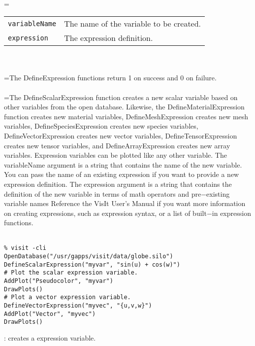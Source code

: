 \documentclass[10pt,a4paper]{report}
\begin{document}
 \\ 
\hangindent=\parindent 
\begin{tabular}{ll}
\verb!variableName! & The name of the variable to be created. \\
\verb!expression! & The expression definition. \\
\end{tabular} \\[-2mm]


 \\ 
\hangindent=\parindent The DefineExpression functions return 1 on success and 0 on failure. \\[-3mm] 

 \\ 
\hangindent=\parindent The DefineScalarExpression function creates a new scalar variable based on other variables from the open database. Likewise, the DefineMaterialExpression function creates new material variables, DefineMeshExpression creates new mesh variables, DefineSpeciesExpression creates new species variables, DefineVectorExpression creates new vector variables, DefineTensorExpression creates new tensor variables, and DefineArrayExpression creates new array variables. Expression variables can be plotted like any other variable. The variableName argument is a string that contains the name of the new variable. You can pass the name of an existing expression if you want to provide a new expression definition. The expression argument is a string that contains the definition of the new variable in terms of math operators and pre$-$existing variable names Reference the VisIt User's Manual if you want more information on  creating expressions, such as expression syntax, or a list of built$-$in expression functions. \\[-3mm] 

\\[-6mm]
\begin{verbatim}% visit -cli
OpenDatabase("/usr/gapps/visit/data/globe.silo")
DefineScalarExpression("myvar", "sin(u) + cos(w)")
# Plot the scalar expression variable.
AddPlot("Pseudocolor", "myvar")
DrawPlots()
# Plot a vector expression variable.
DefineVectorExpression("myvec", "{u,v,w}")
AddPlot("Vector", "myvec")
DrawPlots()
\end{verbatim}
\newpage


{}
: creates a expression variable.\\[-3mm]
\end{document}
